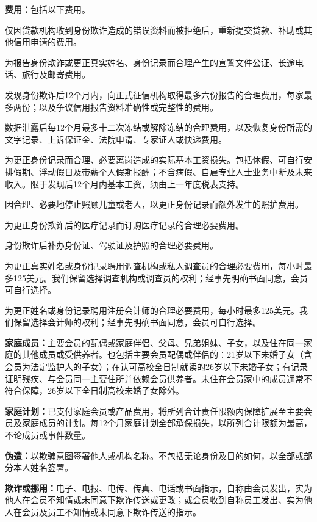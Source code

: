 \documentclass[UTF8,fontset=none,11pt,a4paper]{ctexart}
\begin{document}
\textbf{费用：}包括\allowbreak\mbox{以下费用。}


仅因贷款机构收到身份欺诈造成的错误资料而被拒绝后，重新提交贷款、补助或其他信用申\allowbreak\mbox{请的费用。}


为报告身份欺诈或更正真实姓名、身份记录而合理产生的宣誓文件公证、长途电话、旅行及\allowbreak\mbox{邮寄费用。}


发现身份欺诈后12个月内，向正式征信机构取得最多六份报告的合理费用，每家最多两份；以及争议信用报告资料准确性或完整\allowbreak\mbox{性的费用。}


数据泄露后每12个月最多十二次冻结或解除冻结的合理费用，以及恢复身份所需的文字记录、上诉保证金、法院申请、专家证人或\allowbreak\mbox{快递费用。}


为更正身份记录而合理、必要离岗造成的实际基本工资损失。包括休假、可自行安排假期、浮动假日及带薪个人假期报酬；不含病假、自雇专业人士业务中断及未来收入。限于发现后12个月内基本工资，须由上一年度\allowbreak\mbox{税表支持。}


因合理、必要地停止照顾儿童或老人，以更正身份记录而额外发生的\allowbreak\mbox{照护费用。}


为更正身份欺诈后的医疗记录而订购医疗记录的合理\allowbreak\mbox{必要费用。}


身份欺诈后补办身份证、驾驶证及护照的合理\allowbreak\mbox{必要费用。}


为更正真实姓名或身份记录聘用调查机构或私人调查员的合理必要费用，每小时最多125美元。我们保留选择调查机构或调查员的权利；经事先明确书面同意，会员可\allowbreak\mbox{自行选择。}


为更正姓名或身份记录聘用注册会计师的合理必要费用，每小时最多125美元。我们保留选择会计师的权利；经事先明确书面同意，会员可\allowbreak\mbox{自行选择。}


\textbf{家庭成员：}主要会员的配偶或家庭伴侣、父母、兄弟姐妹、子女，以及住在同一家庭的其他成员或受供养者。也包括主要会员配偶或伴侣的：21岁以下未婚子女（含会员为法定监护人的子女）；在认可高校全日制就读的26岁以下未婚子女；有记录证明残疾、与会员同一主要住所并依赖会员供养者。未住在会员家中的成员通常不符合保障，26岁以下全日制高校未婚\allowbreak\mbox{子女除外。}


\textbf{家庭计划：}已支付家庭会员或产品费用，将所列合计责任限额内保障扩展至主要会员及家庭成员的计划。每12个月家庭计划全部承保损失，以所列合计限额为最高，不论成员或\allowbreak\mbox{事件数量。}


\textbf{伪造：}以欺骗意图签署他人或机构名称。不包括无论身份及目的如何，以全部或部分本人\allowbreak\mbox{姓名签署。}


\textbf{欺诈或挪用：}电子、电报、电传、传真、电话或书面指示，自称由会员发出，实为他人在会员不知情或未同意下欺诈传送或更改；或会员收到自称员工发出、实为他人在会员及员工不知情或未同意下欺诈传\allowbreak\mbox{送的指示。}
\end{document}

